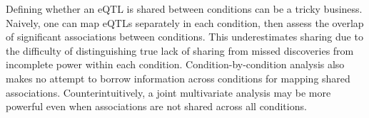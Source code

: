 Defining whether an \gls{eQTL} is shared between conditions can be a tricky business.
Naively, one can map \glspl{eQTL} separately in each condition, then assess the overlap of significant associations between conditions.
This underestimates sharing due to the difficulty of distinguishing true lack of sharing from missed discoveries from incomplete power within each condition.
Condition-by-condition analysis also makes no attempt to borrow information across conditions for mapping shared associations\autocite{flutre2013StatisticalFrameworkJoint,urbut2018FlexibleStatisticalMethods,li2018HTeQTLIntegrativeExpression}.
Counterintuitively, a joint multivariate analysis may be more powerful even when associations are not shared across all conditions\autocite{stephens2013UnifiedFrameworkAssociation}.

%
